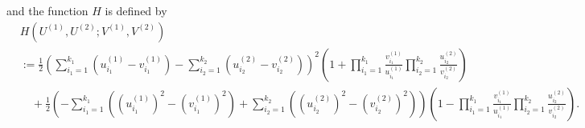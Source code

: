 \documentclass{article}
\numberwithin{equation}{section}
\begin{document}
and the function $H$ is defined by
\begin{equation}
	\label{eq:def_H}
	\begin{split}
		&H(U^{(1)},U^{(2)};V^{(1)},V^{(2)})\\
		&:=\frac12 \left(
		                 \sum_{i_1=1}^{k_1} (u^{(1)}_{i_1}-v^{(1)}_{i_1})
		                -\sum_{i_2=1}^{k_2} (u^{(2)}_{i_2}-v^{(2)}_{i_2})
		           \right)^2
		           \left(
		                 1 + \prod_{i_1=1}^{k_1}
		                          \frac{v_{i_1}^{(1)}}
		                               {u_{i_1}^{(1)}}
		                     \prod_{i_2=1}^{k_2}
		                          \frac{u_{i_2}^{(2)}}
		                               {v_{i_2}^{(2)}}		                     
		           \right)\\
		&\quad +
	       \frac12 \left(
	                    -\sum_{i_1=1}^{k_1}    
	                            \left(
	                                (u^{(1)}_{i_1})^2-(v^{(1)}_{i_1})^2
	                            \right)
	                    +\sum_{i_2=1}^{k_2} 
	                            \left(
	                                (u^{(2)}_{i_2})^2-(v^{(2)}_{i_2})^2
	                            \right)
	               \right)
	               \left(
	                     1 - \prod_{i_1=1}^{k_1}
	                             \frac{v_{i_1}^{(1)}}
	                                  {u_{i_1}^{(1)}}
	                         \prod_{i_2=1}^{k_2}
	                             \frac{u_{i_2}^{(2)}}
	                                  {v_{i_2}^{(2)}}
	               \right).
	\end{split}
\end{equation}

\bigskip
\end{document}
